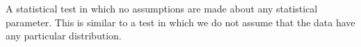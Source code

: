 A statistical test in which no assumptions are made about any statistical parameter.
This is similar to a test in which we do not assume that the data have any particular 
distribution.